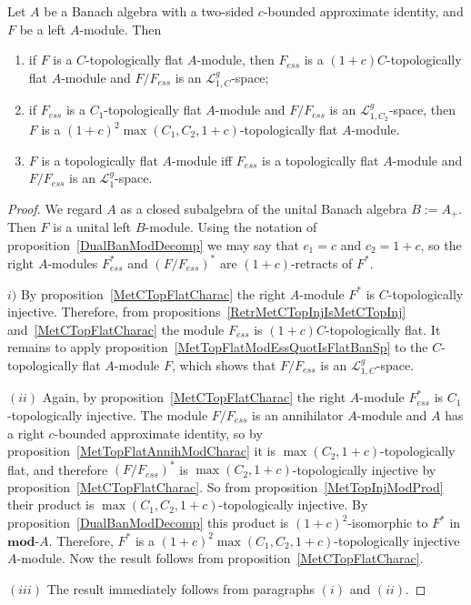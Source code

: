 \begin{proposition}\label{TopFlatModCharac} Let $A$ be a Banach algebra with
a two-sided $c$-bounded approximate identity, and $F$ be a left $A$-module. Then

\begin{enumerate}[label = (\roman*)]
    \item if $F$ is a $C$-topologically flat $A$-module, then $F_{ess}$ is a
    $(1+c)C$-topologically flat $A$-module and $F/F_{ess}$ is an
    $\mathscr{L}_{1,C}^g$-space;

    \item if $F_{ess}$ is a $C_1$-topologically flat $A$-module and $F/F_{ess}$ is 
    an $\mathscr{L}_{1,C_2}^g$-space, then $F$ is a ${(1+c)}^2\max(C_1,
    C_2,1+c)$-topologically flat $A$-module.

    \item $F$ is a topologically flat $A$-module iff $F_{ess}$ is a topologically
    flat $A$-module and $F/F_{ess}$ is an $\mathscr{L}_1^g$-space.
\end{enumerate}
\end{proposition}
\begin{proof} We regard $A$ as a closed subalgebra of the unital Banach algebra
$B:=A_+$. Then $F$ is a unital left $B$-module. Using the notation of
proposition~\ref{DualBanModDecomp} we may say that $c_1=c$ and $c_2=1+c$, so the
right $A$-modules $F_{ess}^*$ and ${(F/F_{ess})}^*$ are $(1+c)$-retracts of
$F^*$.

$i)$ By proposition~\ref{MetCTopFlatCharac} the right $A$-module $F^*$ is
$C$-topologically injective. Therefore, from
propositions~\ref{RetrMetCTopInjIsMetCTopInj} and~\ref{MetCTopFlatCharac} the
module $F_{ess}$ is $(1+c)C$-topologically flat. It remains to apply
proposition~\ref{MetTopFlatModEssQuotIsFlatBanSp} to the $C$-topologically flat
$A$-module $F$, which shows that $F/F_{ess}$ is an
$\mathscr{L}_{1,C}^g$-space.

$(ii)$ Again, by proposition~\ref{MetCTopFlatCharac} the right $A$-module
$F_{ess}^*$ is $C_1$-topologically injective. The module $F/F_{ess}$ is an
annihilator $A$-module and $A$ has a right $c$-bounded approximate identity, so
by proposition~\ref{MetTopFlatAnnihModCharac} it is
$\max(C_2,1+c)$-topologically flat, and therefore ${(F/F_{ess})}^*$ is
$\max(C_2,1+c)$-topologically injective by
proposition~\ref{MetCTopFlatCharac}. So from
proposition~\ref{MetTopInjModProd} their product is
$\max(C_1,C_2,1+c)$-topologically injective. By proposition~\ref{DualBanModDecomp}
this product is ${(1+c)}^2$-isomorphic to $F^*$ in $\mathbf{mod}\text{-}A$. Therefore,
$F^*$ is a ${(1+c)}^2\max(C_1, C_2,1+c)$-topologically injective $A$-module. Now the
result follows from proposition~\ref{MetCTopFlatCharac}.

$(iii)$ The result immediately follows from paragraphs $(i)$ and $(ii)$.
\end{proof}

